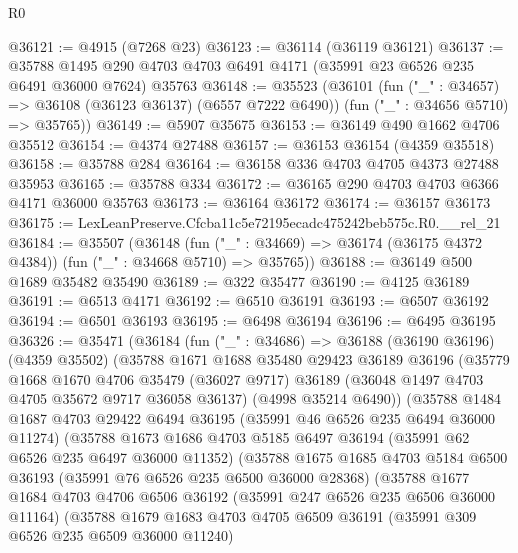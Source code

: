 \begin{lexlean}{R0}
\begin{coremodule}
@36121 := @4915 (@7268 @23)
@36123 := @36114 (@36119 @36121)
@36137 := @35788
    @1495
    @290
    @4703
    @4703
    @6491
    @4171
    (@35991 @23 @6526 @235 @6491 @36000 @7624)
    @35763
@36148 := @35523
    (@36101
      (fun ("_" : @34657) => @36108 (@36123 @36137) (@6557 @7222 @6490))
      (fun ("_" : @34656 @5710) => @35765))
@36149 := @5907 @35675
@36153 := @36149 @490 @1662 @4706 @35512
@36154 := @4374 @27488
@36157 := @36153 @36154 (@4359 @35518)
@36158 := @35788 @284
@36164 := @36158 @336 @4703 @4705 @4373 @27488 @35953
@36165 := @35788 @334
@36172 := @36165 @290 @4703 @4703 @6366 @4171 @36000 @35763
@36173 := @36164 @36172
@36174 := @36157 @36173
@36175 := LexLeanPreserve.Cfcba11c5e72195ecadc475242beb575c.R0.__rel_21
@36184 := @35507
    (@36148
      (fun ("_" : @34669) => @36174 (@36175 @4372 @4384))
      (fun ("_" : @34668 @5710) => @35765))
@36188 := @36149 @500 @1689 @35482 @35490
@36189 := @322 @35477
@36190 := @4125 @36189
@36191 := @6513 @4171
@36192 := @6510 @36191
@36193 := @6507 @36192
@36194 := @6501 @36193
@36195 := @6498 @36194
@36196 := @6495 @36195
@36326 := @35471
    (@36184
      (fun ("_" : @34686) =>
      @36188
        (@36190 @36196)
        (@4359 @35502)
        (@35788
          @1671
          @1688
          @35480
          @29423
          @36189
          @36196
          (@35779
            @1668
            @1670
            @4706
            @35479
            (@36027 @9717)
            @36189
            (@36048 @1497 @4703 @4705 @35672 @9717 @36058 @36137)
            (@4998 @35214 @6490))
          (@35788
            @1484
            @1687
            @4703
            @29422
            @6494
            @36195
            (@35991 @46 @6526 @235 @6494 @36000 @11274)
            (@35788
              @1673
              @1686
              @4703
              @5185
              @6497
              @36194
              (@35991 @62 @6526 @235 @6497 @36000 @11352)
              (@35788
                @1675
                @1685
                @4703
                @5184
                @6500
                @36193
                (@35991 @76 @6526 @235 @6500 @36000 @28368)
                (@35788
                  @1677
                  @1684
                  @4703
                  @4706
                  @6506
                  @36192
                  (@35991 @247 @6526 @235 @6506 @36000 @11164)
                  (@35788
                    @1679
                    @1683
                    @4703
                    @4705
                    @6509
                    @36191
                    (@35991 @309 @6526 @235 @6509 @36000 @11240)

\end{coremodule}
\end{lexlean}
